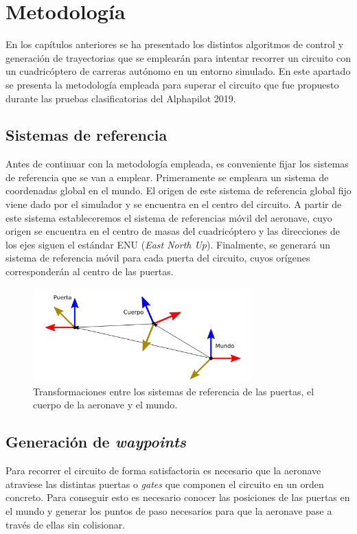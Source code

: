 \chapter{Metodología}
	
En los capítulos anteriores se ha presentado los distintos algoritmos de control y generación de trayectorias que se emplearán para intentar recorrer un circuito con un cuadricóptero de carreras autónomo en un entorno simulado. En este apartado se presenta la metodología empleada para superar el circuito que fue propuesto durante las pruebas clasificatorias del Alphapilot 2019.

\section{Sistemas de referencia}
Antes de continuar con la metodología empleada, es conveniente fijar los sistemas de referencia que se van a emplear. Primeramente se empleara un sistema de coordenadas global en el mundo. El origen de este sistema de referencia global fijo viene dado por el simulador y se encuentra en el centro del circuito. A partir de este sistema estableceremos el sistema de referencias móvil del aeronave, cuyo origen se encuentra en el centro de masas del cuadricóptero y las direcciones de los ejes siguen el estándar ENU (\textit{East North Up}). Finalmente, se generará un sistema de referencia móvil para cada puerta del circuito, cuyos orígenes corresponderán al centro de las puertas. 

\begin{figure}[htb!]
	\centering
	\includegraphics[width=0.75\textwidth]{imagenes/frames}
	\caption{Transformaciones entre los sistemas de referencia de las puertas, el cuerpo de la aeronave y el mundo.}
	\label{waypoints:Refs}
\end{figure}



\section{Generación de \textit{waypoints}}
Para recorrer el circuito de forma satisfactoria es necesario que la aeronave atraviese las distintas puertas o \textit{gates} que componen el circuito en un orden concreto. Para conseguir esto es necesario conocer las posiciones de las puertas en el mundo y generar los puntos de paso necesarios para que la aeronave pase a través de ellas sin colisionar.

